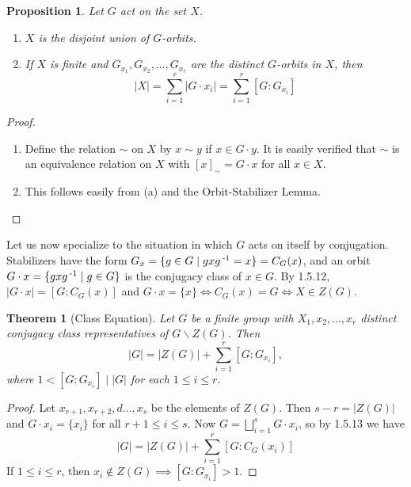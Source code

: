 \documentclass[11pt]{book}
\newcounter{counter}
\newtheorem{theorem}[counter]{Theorem}   \newtheorem*{theorem*}{Theorem}   \newtheorem{lemma}[counter]{Lemma}   \newtheorem{corollary}[counter]{Corollary}
\newtheorem{proposition}[counter]{Proposition}   \newtheorem{problem}[counter]{Problem}   \newtheorem*{proposition*}{Proposition}   \newtheorem*{lemma*}{Lemma}
\theoremstyle{definition}   \newtheorem{defn}[counter]{Definition} %
\newcommand{\bs}{\backslash}   \newcommand{\A}{\mathcal{A}}   \newcommand{\sy}{\textnormal{Syl}}   \newcommand{\size}[1]{\left| #1 \right|}
\newcommand{\vs}{\vspace{8pt}}
\numberwithin{counter}{chapter}
\begin{document}
\vs

\begin{proposition}
Let $G$ act on the set $X$.
	\begin{enumerate}
	\item[(a)] $X$ is the disjoint union of $G$-orbits.
	\item[(b)] If $X$ is finite and $G_{x_1},G_{x_2},\dots,G_{x_r}$ are the distinct $G$-orbits in $X$, then
		\[|X| = \sum_{i=1}^r |G\cdot x_i| = \sum_{i=1}^r [G : G_{x_i}] \]
	\end{enumerate}
\end{proposition}

\begin{proof}
\
\begin{enumerate}
\item[(a)] Define the relation $\sim$ on $X$ by $x \sim y$ if $x \in G \cdot y$. It is easily verified that $\sim$ is an equivalence relation on $X$ with $[x]_{\sim} = G\cdot x$ for all $x \in X$.
\item[(b)] This follows easily from (a) and the Orbit-Stabilizer Lemma.
\end{enumerate}
\end{proof}

\vs

Let us now specialize to the situation in which $G$ acts on itself by conjugation. Stabilizers have the form $G_x = \{g \in G \mid gxg\operatorname{^{-1}} = x\} = C_G(x)$, and an orbit $G\cdot x = \{gxg\operatorname{^{-1}} \mid g\in G\}$ is the conjugacy class of $x\in G$. By 1.5.12, $|G\cdot x| = [G : C_G(x)]$ and $G\cdot x = \{x\} \iff C_G(x) = G \iff X \in Z(G)$.

\vs

\begin{theorem}[Class Equation]
Let $G$ be a finite group with $X_1,x_2,\dots,x_r$ distinct conjugacy class representatives of $G\bs Z(G)$. Then
	\[ |G| = |Z(G)| + \sum_{i=1}^r [G : G_{x_i}], \]
where $1 < [G : G_{x_i}] \mid |G|$ for each $1 \leq i \leq r$.
\end{theorem}

\begin{proof}
Let $x_{r+1},x_{r+2},d\dots,x_s$ be the elements of $Z(G)$. Then $s-r = |Z(G)|$ and $G\cdot x_i = \{x_i\}$ for all $r+1 \leq i \leq s$. Now $G = \bigsqcup_{i=1}^s G\cdot x_i$, so by 1.5.13 we have
	\[ |G| = |Z(G)| + \sum_{i=1}^r [G : C_G(x_i)] \]
If $1 \leq i \leq r$, then $x_i \notin Z(G) \implies [G : G_{x_i}] > 1$.
\end{proof}

\vs
\end{document}

